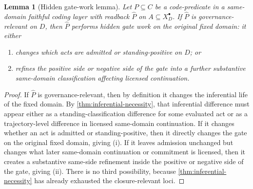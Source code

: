 \documentclass[11pt]{article}
\theoremstyle{plain}
\newtheorem{lemma}[theorem]{Lemma}
\theoremstyle{definition}
\newcommand{\Eval}{X_D^{\bullet}}
\newcommand{\domain}{D}
\begin{document}
\begin{lemma}[Hidden gate-work lemma]
\label{lem:hidden-gate}
Let $P\subseteq C$ be a code-predicate in a same-domain faithful coding layer with readback $\widehat P$ on $A\subseteq \Eval$. If $\widehat P$ is governance-relevant on $\domain$, then $\widehat P$ performs hidden gate work on the original fixed domain: it either
\begin{enumerate}[label=(\roman*), leftmargin=2.5em]
    \item changes which acts are admitted or standing-positive on $\domain$; or
    \item refines the positive side or negative side of the gate into a further substantive same-domain classification affecting licensed continuation.
\end{enumerate}
\end{lemma}

\begin{proof}
If $\widehat P$ is governance-relevant, then by definition it changes the inferential life of the fixed domain. By \cref{thm:inferential-necessity}, that inferential difference must appear either as a standing-classification difference for some evaluated act or as a trajectory-level difference in licensed same-domain continuation. If it changes whether an act is admitted or standing-positive, then it directly changes the gate on the original fixed domain, giving (i). If it leaves admission unchanged but changes what later same-domain continuation or commitment is licensed, then it creates a substantive same-side refinement inside the positive or negative side of the gate, giving (ii). There is no third possibility, because \cref{thm:inferential-necessity} has already exhausted the closure-relevant loci.
\end{proof}
\end{document}
